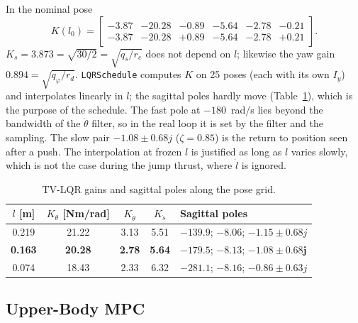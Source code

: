 \documentclass[11pt,a4paper]{article}
\begin{document}
In the nominal pose
\begin{equation}
    K(l_0)=\begin{bmatrix}-3.87&-20.28&-0.89&-5.64&-2.78&-0.21\\-3.87&-20.28&+0.89&-5.64&-2.78&+0.21\end{bmatrix}.
\end{equation}
$K_s = 3.873 = \sqrt{30/2} = \sqrt{q_s/r_c}$ does not depend on $l$; likewise the yaw gain
$0.894 = \sqrt{q_\varphi/r_d}$.  \texttt{LQRSchedule} computes $K$ on 25 poses (each with its own
$I_y$) and interpolates linearly in $l$; the sagittal poles hardly move
(Table~\ref{tab:lqr_sched}), which is the purpose of the schedule.  The fast pole at $-180$~rad/s
lies beyond the bandwidth of the $\dot\theta$ filter, so in the real loop it is set by the filter
and the sampling.  The slow pair $-1.08\pm0.68j$ ($\zeta = 0.85$) is the return to position seen
after a push.  The interpolation at frozen $l$ is justified as long as $l$ varies slowly, which
is not the case during the jump thrust, where $\dot l$ is ignored.

\begin{table}[H]
    \centering
    \caption{TV-LQR gains and sagittal poles along the pose grid.}
    \label{tab:lqr_sched}
    \begin{tabular}{ccccl}
        \toprule
        $l$ [m] & $K_\theta$ [Nm/rad] & $K_{\dot\theta}$ & $K_{\dot s}$ & Sagittal poles \\
        \midrule
        0.219 & 21.22 & 3.13 & 5.51 & $-139.9$; $-8.06$; $-1.15\pm0.68j$ \\
        \textbf{0.163} & \textbf{20.28} & \textbf{2.78} & \textbf{5.64} & $\bm{-179.5}$; $\bm{-8.13}$; $\bm{-1.08\pm0.68j}$ \\
        0.074 & 18.43 & 2.33 & 6.32 & $-281.1$; $-8.16$; $-0.86\pm0.63j$ \\
        \bottomrule
    \end{tabular}
\end{table}

\subsection{Upper-Body MPC}
\end{document}
